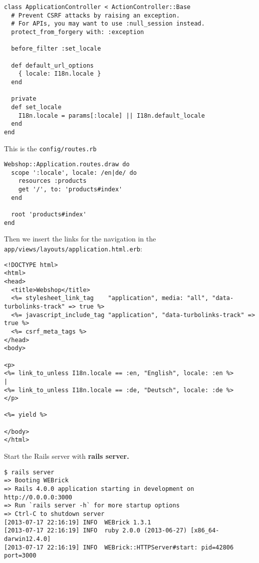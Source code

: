 \documentclass[a4paper]{book}
\begin{document}
\begin{shaded}\begin{verbatim}
class ApplicationController < ActionController::Base
  # Prevent CSRF attacks by raising an exception.
  # For APIs, you may want to use :null_session instead.
  protect_from_forgery with: :exception

  before_filter :set_locale

  def default_url_options
    { locale: I18n.locale }
  end

  private
  def set_locale
    I18n.locale = params[:locale] || I18n.default_locale
  end
end
\end{verbatim}\end{shaded}

This is the \texttt{config/routes.rb}

\begin{shaded}\begin{verbatim}
Webshop::Application.routes.draw do
  scope ':locale', locale: /en|de/ do
    resources :products
    get '/', to: 'products#index'
  end

  root 'products#index'
end
\end{verbatim}\end{shaded}

Then we insert the links for the navigation in the \texttt{app/views/layouts/application.html.erb}:

\begin{shaded}\begin{verbatim}
<!DOCTYPE html>
<html>
<head>
  <title>Webshop</title>
  <%= stylesheet_link_tag    "application", media: "all", "data-turbolinks-track" => true %>
  <%= javascript_include_tag "application", "data-turbolinks-track" => true %>
  <%= csrf_meta_tags %>
</head>
<body>

<p>
<%= link_to_unless I18n.locale == :en, "English", locale: :en %>
|
<%= link_to_unless I18n.locale == :de, "Deutsch", locale: :de %>
</p>

<%= yield %>

</body>
</html>
\end{verbatim}\end{shaded}

Start the Rails server with \textbf{rails server.}

\begin{shaded}\begin{verbatim}
$ rails server
=> Booting WEBrick
=> Rails 4.0.0 application starting in development on http://0.0.0.0:3000
=> Run `rails server -h` for more startup options
=> Ctrl-C to shutdown server
[2013-07-17 22:16:19] INFO  WEBrick 1.3.1
[2013-07-17 22:16:19] INFO  ruby 2.0.0 (2013-06-27) [x86_64-darwin12.4.0]
[2013-07-17 22:16:19] INFO  WEBrick::HTTPServer#start: pid=42806 port=3000
\end{verbatim}\end{shaded}
\end{document}
